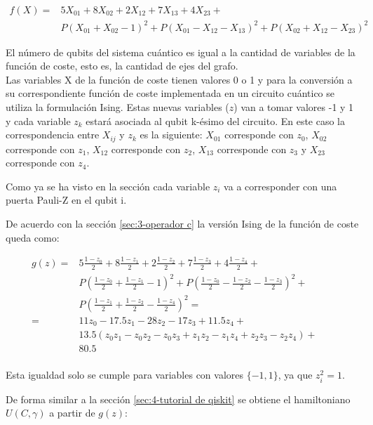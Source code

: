 \begin{align*}
  f(X) = &5X_{01} + 8X_{02} + 2X_{12} + 7X_{13} + 4X_{23} + &&\\
         &P(X_{01} + X_{02} - 1)^2 + P(X_{01} - X_{12} - X_{13})^2 + P(X_{02} + X_{12} - X_{23})^2
\end{align*}

El número de qubits del sistema cuántico es igual a la cantidad de variables de la función de coste, esto es, la cantidad de ejes del grafo. \\
Las variables X de la función de coste tienen valores 0 o 1 y para la conversión a su correspondiente función de coste implementada en un circuito cuántico se utiliza la formulación Ising.  %
Estas nuevas variables ($z$) van a tomar valores -1 y 1 y cada variable $z_k$ estará asociada al qubit k-ésimo del circuito. En este caso la correspondencia entre $X_{ij}$ y $z_k$ es la siguiente:
$X_{01}$ corresponde con $z_0$,
$X_{02}$ corresponde con $z_1$,
$X_{12}$ corresponde con $z_2$,
$X_{13}$ corresponde con $z_3$ y
$X_{23}$ corresponde con $z_4$.

Como ya se ha visto en la sección  %
cada variable $z_i$ va a corresponder con una puerta Pauli-Z en el qubit i.

De acuerdo con la sección \ref{sec:3-operador c} la versión Ising de la función de coste queda como:

\begin{align*}
  g(z) = &5\frac{1-z_0}{2} + 8\frac{1-z_1}{2} + 2\frac{1-z_2}{2} + 7\frac{1-z_3}{2} + 4\frac{1-z_4}{2} + &&\\
         &P(\frac{1-z_0}{2} + \frac{1-z_1}{2} - 1)^2 + P(\frac{1-z_0}{2} - \frac{1-z_2}{2} - \frac{1-z_3}{2})^2 + \\
         &P(\frac{1-z_1}{2} + \frac{1-z_2}{2} - \frac{1-z_4}{2})^2 = \\
       = & 11z_0 - 17.5z_1 - 28z_2 - 17z_3 + 11.5z_4 + \\
         &13.5(z_0z_1 - z_0z_2 - z_0z_3 + z_1z_2 - z_1z_4 + z_2z_3 - z_2z_4) + \\
         &80.5 \\
\end{align*}
\par
Esta igualdad solo se cumple para variables con valores \(\{-1, 1\}\), ya que \(z_i^2 = 1\). \\

\par
De forma similar a la sección \ref{sec:4-tutorial de qiskit} se obtiene el hamiltoniano $U(C, \gamma)$ a partir de $g(z)$:

